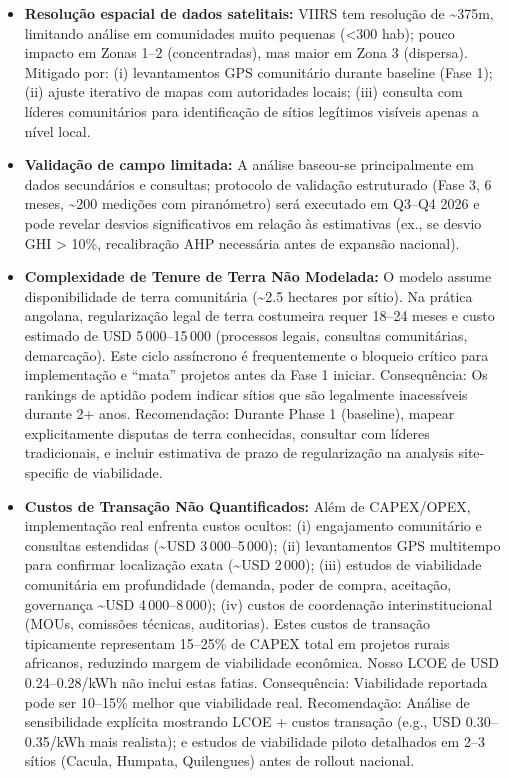 \documentclass[12pt, a4paper]{article}
\begin{document}
\begin{itemize}
\item \textbf{Resolução espacial de dados satelitais:} VIIRS tem resolução de \textasciitilde{}375m, limitando análise em comunidades muito pequenas (<300 hab); pouco impacto em Zonas 1--2 (concentradas), mas maior em Zona 3 (dispersa). Mitigado por: (i) levantamentos GPS comunitário durante baseline (Fase 1); (ii) ajuste iterativo de mapas com autoridades locais; (iii) consulta com líderes comunitários para identificação de sítios legítimos visíveis apenas a nível local.

\item \textbf{Validação de campo limitada:} A análise baseou-se principalmente em dados secundários e consultas; protocolo de validação estruturado (Fase 3, 6 meses, \textasciitilde{}200 medições com piranómetro) será executado em Q3--Q4 2026 e pode revelar desvios significativos em relação às estimativas (ex., se desvio GHI > 10\%, recalibração AHP necessária antes de expansão nacional).

\item \textbf{Complexidade de Tenure de Terra Não Modelada:} O modelo assume disponibilidade de terra comunitária (\textasciitilde{}2.5 hectares por sítio). Na prática angolana, regularização legal de terra costumeira requer 18--24 meses e custo estimado de USD 5\,000--15\,000 (processos legais, consultas comunitárias, demarcação). Este ciclo assíncrono é frequentemente o bloqueio crítico para implementação e ``mata'' projetos antes da Fase 1 iniciar. Consequência: Os rankings de aptidão podem indicar sítios que são legalmente inacessíveis durante 2+ anos. Recomendação: Durante Phase 1 (baseline), mapear explicitamente disputas de terra conhecidas, consultar com líderes tradicionais, e incluir estimativa de prazo de regularização na analysis site-specific de viabilidade.

\item \textbf{Custos de Transação Não Quantificados:} Além de CAPEX/OPEX, implementação real enfrenta custos ocultos: (i) engajamento comunitário e consultas estendidas (\textasciitilde{}USD 3\,000--5\,000); (ii) levantamentos GPS multitempo para confirmar localização exata (\textasciitilde{}USD 2\,000); (iii) estudos de viabilidade comunitária em profundidade (demanda, poder de compra, aceitação, governança \textasciitilde{}USD 4\,000--8\,000); (iv) custos de coordenação interinstitucional (MOUs, comissões técnicas, auditorias). Estes custos de transação tipicamente representam 15--25\% de CAPEX total em projetos rurais africanos, reduzindo margem de viabilidade econômica. Nosso LCOE de USD 0.24--0.28/kWh não inclui estas fatias. Consequência: Viabilidade reportada pode ser 10--15\% melhor que viabilidade real. Recomendação: Análise de sensibilidade explícita mostrando LCOE + custos transação (e.g., USD 0.30--0.35/kWh mais realista); e estudos de viabilidade piloto detalhados em 2--3 sítios (Cacula, Humpata, Quilengues) antes de rollout nacional.


\end{itemize}
\end{document}
